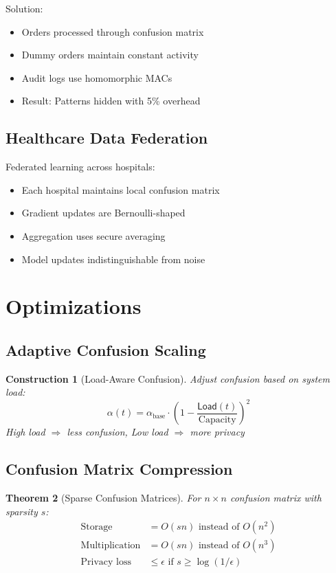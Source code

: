 \documentclass[11pt,final]{article}
\newcommand{\Load}{\mathsf{Load}}
\newtheorem{theorem}{Theorem}[section]
\newtheorem{construction}[theorem]{Construction}
\begin{document}
Solution:
\begin{itemize}
    \item Orders processed through confusion matrix
    \item Dummy orders maintain constant activity
    \item Audit logs use homomorphic MACs
    \item Result: Patterns hidden with 5\% overhead
\end{itemize}

\subsection{Healthcare Data Federation}

Federated learning across hospitals:
\begin{itemize}
    \item Each hospital maintains local confusion matrix
    \item Gradient updates are Bernoulli-shaped
    \item Aggregation uses secure averaging
    \item Model updates indistinguishable from noise
\end{itemize}

\section{Optimizations}

\subsection{Adaptive Confusion Scaling}

\begin{construction}[Load-Aware Confusion]
Adjust confusion based on system load:
\begin{equation}
\alpha(t) = \alpha_{\text{base}} \cdot \left(1 - \frac{\Load(t)}{\text{Capacity}}\right)^2
\end{equation}
High load $\Rightarrow$ less confusion, Low load $\Rightarrow$ more privacy
\end{construction}

\subsection{Confusion Matrix Compression}

\begin{theorem}[Sparse Confusion Matrices]
For $n \times n$ confusion matrix with sparsity $s$:
\begin{align}
\text{Storage} &= O(sn) \text{ instead of } O(n^2) \\
\text{Multiplication} &= O(sn) \text{ instead of } O(n^3) \\
\text{Privacy loss} &\leq \epsilon \text{ if } s \geq \log(1/\epsilon)
\end{align}
\end{theorem}
\end{document}
